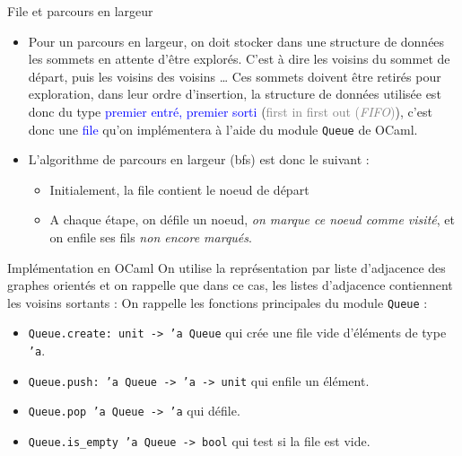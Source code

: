 \documentclass[10pt]{beamer}
\begin{document}
\begin{frame}[fragile]{\Ctitle}{\stitle}
	\begin{block}{File et parcours en largeur}
		\begin{itemize}
			\item<1-> Pour un parcours en largeur, on doit stocker dans une structure de données les sommets en attente d'être explorés. C'est à dire les voisins du sommet de départ, puis les voisins des voisins \dots
				Ces sommets doivent être retirés pour exploration, dans leur ordre d'insertion, la structure de données utilisée est donc du type \textcolor{blue}{premier entré, premier sorti} (\textcolor{gray}{first in first out (\textit{FIFO})}), c'est donc une \textcolor{blue}{file} qu'on implémentera à l'aide du module \texttt{Queue} de OCaml.
			\item<2-> L'algorithme de parcours en largeur ({\sc bfs}) est donc le suivant :
				\begin{itemize}
					\item<3-> Initialement, la file contient le noeud de départ
					\item<4-> A chaque étape, on défile un noeud, \textit{on marque ce noeud comme visité}, et on enfile ses fils \textit{non encore marqués}.
				\end{itemize}
		\end{itemize}
	\end{block}
\end{frame}

\begin{frame}[fragile]{\Ctitle}{\stitle}
	\begin{block}{Implémentation en OCaml}
		On utilise la représentation par liste d'adjacence des graphes orientés et on rappelle que dans ce cas, les listes d'adjacence contiennent les voisins \textcolor{BrickRed}{sortants} :
		On rappelle les fonctions principales du module \texttt{Queue} :
		\begin{itemize}
			\item \texttt{Queue.create: unit -> 'a Queue}  qui crée une file vide d'éléments de type {\tt 'a}.
			\item \texttt{Queue.push: 'a Queue -> 'a -> unit}  qui enfile un élément.
			\item \texttt{Queue.pop 'a Queue -> 'a} qui défile.
			\item \texttt{Queue.is_empty 'a Queue -> bool} qui test si la file est vide.
		\end{itemize}
	\end{block}
\end{frame}
\end{document}
